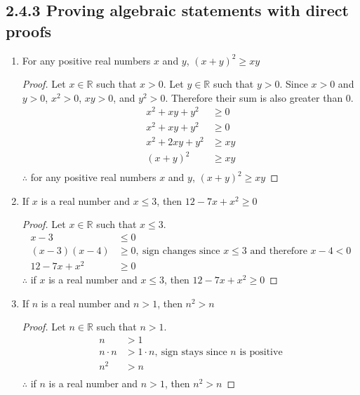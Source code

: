 \documentclass{article}
\newcommand{\bld}{\textbf}
\newcommand{\bb}{\mathbb}
\newcommand{\bitem}[1]{\item[\bld{#1.}]}
\begin{document}
\subsection*{2.4.3 Proving algebraic statements with direct proofs}
\begin{enumerate}
  \bitem{a} For any positive real numbers $x$ and $y$, $(x+y)^2 \geq xy$
  \begin{proof}
    Let $x \in \bb{R}$ such that $x > 0$. Let $y \in \bb{R}$ such that $y > 0$.
    Since $x > 0$ and $y > 0$, $x^2 > 0$, $xy > 0$, and $y^2 > 0$. Therefore their sum is also greater than $0$.
    \begin{align*}
      x^2 + xy + y^2  & \geq 0  \\
      x^2 + xy + y^2  & \geq 0  \\
      x^2 + 2xy + y^2 & \geq xy \\
      (x+y)^2         & \geq xy \\
    \end{align*}
    $\therefore$ for any positive real numbers $x$ and $y$, $(x+y)^2 \geq xy$
  \end{proof}
  \bitem{b} If $x$ is a real number and $x \leq 3$, then $12 - 7x + x^2 \geq 0$
  \begin{proof}
    Let $x \in \bb{R}$ such that $x \leq 3$.
    \begin{align*}
      x-3           & \leq 0                                                               \\
      (x-3)(x-4)    & \geq 0,~\text{sign changes since $x \leq 3$ and therefore $x-4 < 0$} \\
      12 - 7x + x^2 & \geq 0
    \end{align*}
    $\therefore$ if $x$ is a real number and $x \leq 3$, then $12 - 7x + x^2 \geq 0$
  \end{proof}
  \bitem{c} If $n$ is a real number and $n > 1$, then $n^2 > n$
  \begin{proof}
    Let $n \in \bb{R}$ such that $n > 1$.
    \begin{align*}
      n         & > 1                                                  \\
      n \cdot n & > 1 \cdot n,~\text{sign stays since $n$ is positive} \\
      n^2       & > n                                                  \\
    \end{align*}
    $\therefore$ if $n$ is a real number and $n > 1$, then $n^2 > n$
  \end{proof}

\end{enumerate}
\end{document}
